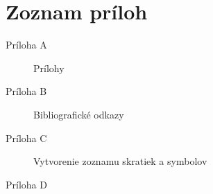 \section*{Zoznam pr\'iloh}
\thispagestyle{empty}

\begin{description}
	\item[Príloha A] Prílohy
	\item[Príloha B] Bibliografické odkazy
	\item[Príloha C] Vytvorenie zoznamu skratiek a symbolov
	\item[Príloha D] 
\end{description}